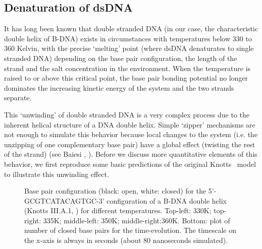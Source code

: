 \subsection{Denaturation of dsDNA}

It has long been known that double stranded DNA (in our case, the characteristic double helix of B-DNA) exists in circumstances with temperatures below 330 to 360 Kelvin, with the precise `melting' point (where dsDNA denaturates to single stranded DNA) depending on the base pair configuration, the length of the strand and the salt concentration in the environment.
When the temperature is raised to or above this critical point, the base pair bonding potential no longer dominates the increasing kinetic energy of the system and the two strands separate. 

This `unwinding' of double stranded DNA is a very complex process due to the inherent helical structure of a DNA double helix.
Simple `zipper' mechanisms are not enough to simulate this behavior because local changes to the system (i.e. the unzipping of one complementary base pair) have a global effect (twisting the rest of the strand) (see Baiesi \etal, \cite{carlon2010unwinding}).
Before we discuss more quantitative elements of this behavior, we first reproduce some basic predictions of the original Knotts \etal\ model \cite{knotts2007coarse} to illustrate this unwinding effect.

\begin{figure}[hbt] \begin{minipage}{7cm}
 \end{minipage} \begin{minipage}{7cm}  \end{minipage}
\begin{minipage}{7cm}
 \end{minipage} \begin{minipage}{7cm}\end{minipage}\begin{center}

\caption{Base pair configuration (black: open, white: closed) for the 5'-GCGTCATACAGTGC-3' configuration of a B-DNA double helix (Knotts III.A.1, \cite{knotts2007coarse}) for different temperatures. Top-left: 330K; top-right: 335K; middle-left: 350K; middle-right:360K. Bottom: plot of number of closed base pairs for the time-evolution. The timescale on the x-axis is always in seconds (about 80 nanoseconds simulated).  } \label{knotts1_configs}\end{center}
\end{figure}

